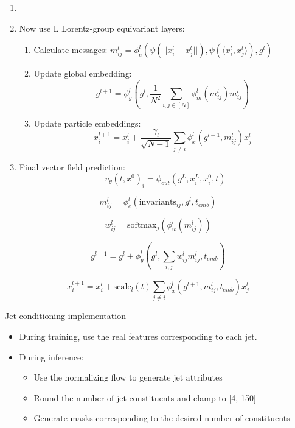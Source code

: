 \documentclass[handout, aspectratio=169,xcolor=dvipsnames]{beamer}
\begin{document}
\begin{frame}
    \begin{enumerate}
    \item[1-4.] %
    \item Now use L Lorentz-group equivariant layers:
    \begin{enumerate}
        \item Calculate messages: $m^l_{ij} = \phi_e^l(\psi(||x_i^l - x_j^l||), \psi(\langle x_i^l, x_j^l \rangle), g^l)$
        \item Update global embedding: 
        $$g^{l+1} = \phi_g^l\left(g^l, \frac{1}{N^2} \sum_{i,j \in [N]} \phi_m^l(m_{ij}^l) m_{ij}^l\right)$$
        \item Update particle embeddings:
        $$x_i^{l+1} = x_i^l + \frac{\gamma_l}{\sqrt{N-1}} \sum_{j \neq i} \phi_x^l(g^{l+1}, m_{ij}^l) x_j^l$$
    \end{enumerate}
    \item Final vector field prediction:
    $$v_\theta(t, x^0)_i = \phi_{out}(g^L, x_i^L, x_i^0, t)$$
\end{enumerate}
\end{frame}


\begin{frame}
    
$$
m^l_{ij} = \phi_e^l(\text{invariants}_{ij}, g^l, t_{emb})$$ 

$$
w^l_{ij} = \text{softmax}_j(\phi_w^l(m^l_{ij}))$$ 

$$
g^{l+1} = g^l + \phi_g^l(g^l, \sum_{i,j} w^l_{ij} m^l_{ij}, t_{emb})$$ 

$$
x_i^{l+1} = x_i^l + \text{scale}_l(t) \sum_{j \neq i} \phi_x^l(g^{l+1}, m^l_{ij}, t_{emb}) x_j^l
$$
\end{frame}

\begin{frame}{Jet conditioning implementation}
    \begin{itemize}
        \item During training, use the real features corresponding to each jet.
        \item During inference: \begin{itemize}
            \item Use the normalizing flow to generate jet attributes
            \item Round the number of jet constituents and clamp to [4, 150]
            \item Generate masks corresponding to the desired number of constituents
        \end{itemize}
    \end{itemize}

\end{frame}
\end{document}
